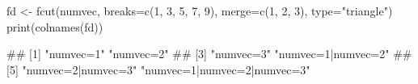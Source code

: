 \begin{Schunk}
% --begin: "fcut.merge2"
\begin{Sinput}
fd <- fcut(numvec,
           breaks=c(1, 3, 5, 7, 9),
           merge=c(1, 2, 3),
           type="triangle")
print(colnames(fd))
\end{Sinput}
\begin{Soutput}
## [1] "numvec=1"                   "numvec=2"                  
## [3] "numvec=3"                   "numvec=1|numvec=2"         
## [5] "numvec=2|numvec=3"          "numvec=1|numvec=2|numvec=3"
\end{Soutput}
%
% --end: "fcut.merge2"
\end{Schunk}
